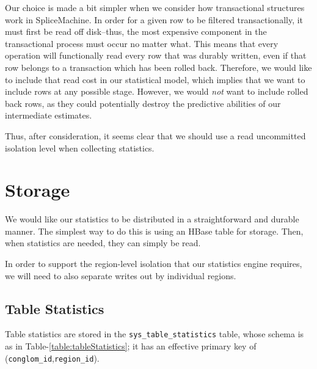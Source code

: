 Our choice is made a bit simpler when we consider how transactional structures work in SpliceMachine. In order for a given row to be filtered transactionally, it must first be read off disk--thus, the most expensive component in the transactional process must occur no matter what. This means that every operation will functionally read every row that was durably written, even if that row belongs to a transaction which has been rolled back. Therefore, we would like to include that read cost in our statistical model, which implies that we want to include rows at any possible stage. However, we would \emph{not} want to include rolled back rows, as they could potentially destroy the predictive abilities of our intermediate estimates. 

Thus, after consideration, it seems clear that we should use a read uncommitted isolation level when collecting statistics.

\section{Storage}
\label{sec:Storage}
We would like our statistics to be distributed in a straightforward and durable manner. The simplest way to do this is using an HBase table for storage. Then, when statistics are needed, they can simply be read.

In order to support the region-level isolation that our statistics engine requires, we will need to also separate writes out by individual regions. 

\subsection{Table Statistics}
Table statistics are stored in the \texttt{sys\_table\_statistics} table, whose schema is as in Table-\ref{table:tableStatistics}; it has an effective primary key of (\texttt{conglom\_id},\texttt{region\_id}).

